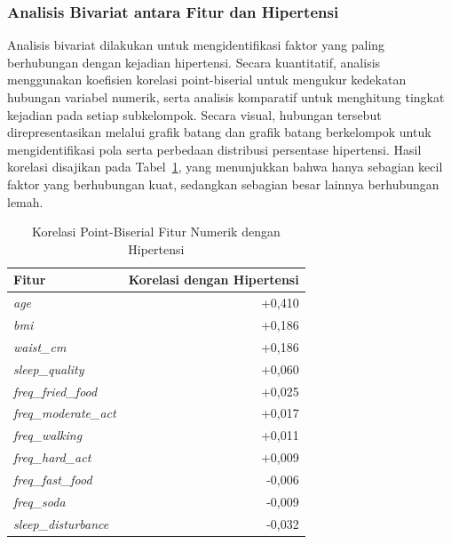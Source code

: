\subsubsection{Analisis Bivariat antara Fitur dan Hipertensi}
 
Analisis bivariat dilakukan untuk mengidentifikasi faktor yang paling berhubungan dengan kejadian hipertensi. Secara kuantitatif, analisis menggunakan koefisien korelasi point-biserial untuk mengukur kedekatan hubungan variabel numerik, serta analisis komparatif untuk menghitung tingkat kejadian pada setiap subkelompok. Secara visual, hubungan tersebut direpresentasikan melalui grafik batang dan grafik batang berkelompok untuk mengidentifikasi pola serta perbedaan distribusi persentase hipertensi. Hasil korelasi disajikan pada Tabel~\ref{tab:korelasi-pointbiserial}, yang menunjukkan bahwa hanya sebagian kecil faktor yang berhubungan kuat, sedangkan sebagian besar lainnya berhubungan lemah.
 
\begin{table}[htbp]
    \centering
    \caption{Korelasi Point-Biserial Fitur Numerik dengan Hipertensi}
    \label{tab:korelasi-pointbiserial}
    \begin{tabular}{@{}lr@{}}
        \toprule
        \textbf{Fitur} & \textbf{Korelasi dengan Hipertensi} \\
        \midrule
        \textit{age}                & +0,410 \\
        \textit{bmi}                & +0,186 \\
        \textit{waist\_cm}          & +0,186 \\
        \textit{sleep\_quality}     & +0,060 \\
        \textit{freq\_fried\_food}  & +0,025 \\
        \textit{freq\_moderate\_act}& +0,017 \\
        \textit{freq\_walking}      & +0,011 \\
        \textit{freq\_hard\_act}    & +0,009 \\
        \textit{freq\_fast\_food}   & -0,006 \\
        \textit{freq\_soda}         & -0,009 \\
        \textit{sleep\_disturbance} & -0,032 \\
        \bottomrule
    \end{tabular}
    \\[4pt]

\end{table}
 
